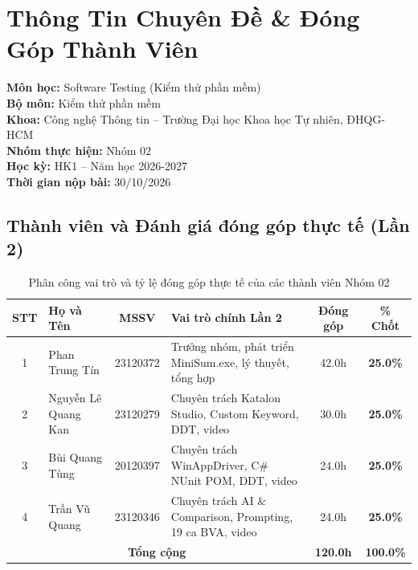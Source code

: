 \section*{Thông Tin Chuyên Đề \& Đóng Góp Thành Viên}

\textbf{Môn học:} Software Testing (Kiểm thử phần mềm) \\
\textbf{Bộ môn:} Kiểm thử phần mềm \\
\textbf{Khoa:} Công nghệ Thông tin -- Trường Đại học Khoa học Tự nhiên, ĐHQG-HCM \\
\textbf{Nhóm thực hiện:} Nhóm 02 \\
\textbf{Học kỳ:} HK1 -- Năm học 2026-2027 \\
\textbf{Thời gian nộp bài:} 30/10/2026

\subsection*{Thành viên và Đánh giá đóng góp thực tế (Lần 2)}

\begin{table}[H]
\centering
\small
\begin{tabular}{|c|l|c|p{7cm}|c|c|}
\hline
\textbf{STT} & \textbf{Họ và Tên} & \textbf{MSSV} & \textbf{Vai trò chính Lần 2} & \textbf{Đóng góp} & \textbf{\% Chốt} \\
\hline
1 & Phan Trung Tín & 23120372 & Trưởng nhóm, phát triển MiniSum.exe, lý thuyết, tổng hợp & 42.0h & \textbf{25.0\%} \\
\hline
2 & Nguyễn Lê Quang Kan & 23120279 & Chuyên trách Katalon Studio, Custom Keyword, DDT, video & 30.0h & \textbf{25.0\%} \\
\hline
3 & Bùi Quang Tùng & 20120397 & Chuyên trách WinAppDriver, C\# NUnit POM, DDT, video & 24.0h & \textbf{25.0\%} \\
\hline
4 & Trần Vũ Quang & 23120346 & Chuyên trách AI \& Comparison, Prompting, 19 ca BVA, video & 24.0h & \textbf{25.0\%} \\
\hline
\multicolumn{4}{|c|}{\textbf{Tổng cộng}} & \textbf{120.0h} & \textbf{100.0\%} \\
\hline
\end{tabular}
\caption{Phân công vai trò và tỷ lệ đóng góp thực tế của các thành viên Nhóm 02}
\label{tab:members}
\end{table}

\pagebreak
